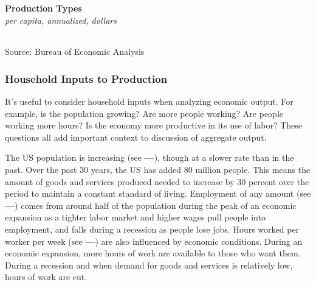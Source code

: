 \documentclass{report}
\begin{document}
\begin{minipage}{0.76\textwidth}

\normalsize \textbf{Production Types}\\
\footnotesize{\textit{per capita, annualized, dollars}}\\
\hspace{-2mm}  \setlength{\tabcolsep}{3.7pt} \color{black!90}
		{\renewcommand{\arraystretch}{1.6}
		 \begin{tabular}{p{38mm} R{12.8mm} R{12.8mm} R{12.8mm} R{12.8mm} R{12.8mm}}
			 \hline
		\end{tabular}}
\vspace{-2mm}

\footnotesize{Source: Bureau of Economic Analysis}
\end{minipage}
\newpage
\begin{minipage}{0.76\textwidth}
\subsubsection*{Household Inputs to Production}
\small It's useful to consider household inputs when analyzing economic output. For example, is the population growing? Are more people working? Are people working more hours? Is the economy more productive in its use of labor? These questions all add important context to discussion of aggregate output.

The US population is increasing (see {\color{lime!90!green}\textbf{---}}), though at a slower rate than in the past. Over the past 30 years, the US has added 80 million people. This means the amount of goods and services produced needed to increase by 30 percent over the period to maintain a constant standard of living. Employment of any amount (see {\color{green!30!teal!90!black}\textbf{---}}) comes from around half of the population during the peak of an economic expansion as a tighter labor market and higher wages pull people into employment, and falls during a recession as people lose jobs. Hours worked per worker per week (see {\color{blue}\textbf{---}}) are also influenced by economic conditions. During an economic expansion, more hours of work are available to those who want them. During a recession and when demand for goods and services is relatively low, hours of work are cut.
\end{minipage}
\vspace{2mm}
\end{document}
